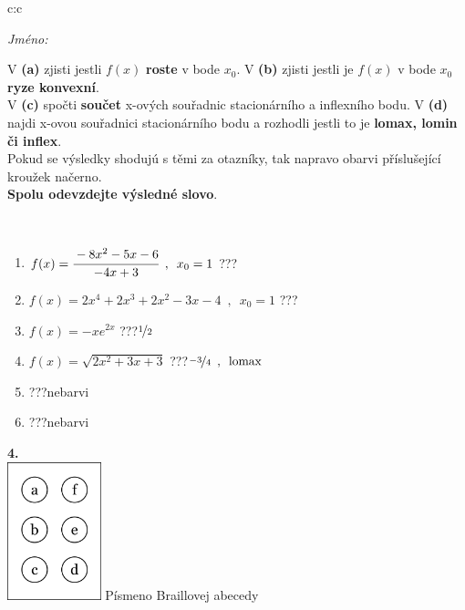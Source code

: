 \documentclass[10pt]{report}
\begin{document}
\begin{tabular}{c:c}
\begin{minipage}[c][104.5mm][t]{0.5\linewidth}
\begin{center}
\textit{Jméno:}\phantom{xxxxxxxxxxxxxxxxxxxxxxxxxxxxxxxxxxxxxxxxxxxxxxxxxxxxxxxxxxxxxxxxx}\\[5mm]
\begin{minipage}{0.95\linewidth}
\begin{center}
{\small V \textbf{(a)} zjisti jestli $f(x)$ \textbf{roste} v bode $x_0$. V \textbf{(b)} zjisti jestli je $f(x)$ v bode $x_0$ \textbf{ryze konvexní}.\\V \textbf{(c)} spočti \textbf{součet} x-ových souřadnic stacionárního a inflexního bodu. V \textbf{(d)} najdi x-ovou souřadnici stacionárního bodu a rozhodli jestli to je \textbf{lomax, lomin či inflex}.\\Pokud se výsledky shodujú s těmi za otazníky, tak napravo obarvi příslušející kroužek načerno.\\\textbf{Spolu odevzdejte výsledné slovo}}.
\end{center}
\end{minipage}
\\[1mm]
\begin{minipage}{0.79\linewidth}
\begin{center}
\begin{varwidth}{\linewidth}
\begin{enumerate}
\normalsize
\item $f(x)=\cfrac{-8x^2-5x-6}{-4x+3}\enspace , \enspace x_0=1$\quad \dotfill\; ???\;\dotfill \quad {}
\item $f(x)=2x^4+2x^3+2x^2-3x-4\enspace , \enspace x_0=1$\quad \dotfill\; ???\;\dotfill \quad {}
\item $f(x)=-xe^{2x}$\quad \dotfill\; ???\;\dotfill \quad $\nicefrac{1}{2}$
\item $f(x)=\sqrt{2x^2+3x+3}$\quad \dotfill\; ???\;\dotfill \quad $\nicefrac{-3}{4}\enspace , \enspace\mathrm{lomax}$
\item \quad \dotfill\; ???\;\dotfill \quad nebarvi
\item \quad \dotfill\; ???\;\dotfill \quad nebarvi
\end{enumerate}
\end{varwidth}
\end{center}
\end{minipage}
\begin{minipage}{0.20\linewidth}
\begin{center}
{\Huge\bfseries 4.} \\[2mm]
\includegraphics[height=40mm]{../images/braille.png}
{\small Písmeno Braillovej abecedy}
\end{center}
\end{minipage}
\end{center}
\end{minipage}
%
\end{tabular}
\end{document}
